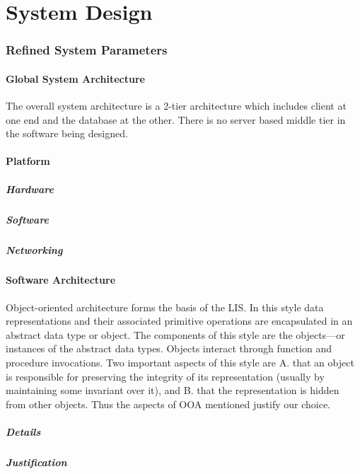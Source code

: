 \documentclass{article}
\begin{document}
\part{System Design}
\section{Refined System Parameters}
\subsection{Global System Architecture}
The overall system architecture is a 2-tier architecture which includes client at one end and the
database at the other. There is no server based middle tier in the software being designed.
\subsection{Platform}
\subsubsection{Hardware}
\subsubsection{Software}
\subsubsection{Networking}
\subsection{Software Architecture}
Object-oriented architecture forms the basis of the LIS. In this style data representations and
their associated primitive operations are encapsulated in an abstract data type or object. The
components of this style are the objects—or instances of the abstract data types. Objects
interact through function and procedure invocations.
Two important aspects of this style are
A. that an object is responsible for preserving the integrity of its representation (usually by
maintaining some invariant over it), and
B. that the representation is hidden from other objects.
Thus the aspects of OOA mentioned justify our choice.
\subsubsection{Details}
\subsubsection{Justification}
\end{document}
